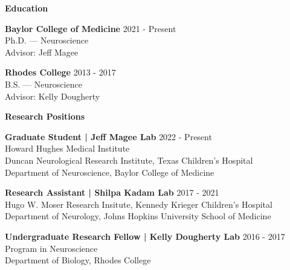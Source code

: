 \documentclass{resume} %
\begin{document}
\begin{rSection}{{\bfseries Education}}
 
    {\bfseries Baylor College of Medicine} \hfill { 2021 - Present }
    \\ Ph.D. — Neuroscience
    \\ Advisor: Jeff Magee \vspace{0.3\baselineskip}
    
    {\bfseries Rhodes College} \hfill { 2013 - 2017  }
    \\ B.S. — Neuroscience
    \\ Advisor: Kelly Dougherty 
    \end{rSection}


\begin{rSection}{{\bfseries Research Positions}}
    
    {\bfseries Graduate Student | Jeff Magee Lab} \hfill {2022 - Present}
    \\ Howard Hughes Medical Institute
    \\ Duncan Neurological Research Institute, Texas Children's Hospital 
    \\ Department of Neuroscience, Baylor College of Medicine \vspace{0.3\baselineskip}

    {\bfseries Research Assistant | Shilpa Kadam Lab} \hfill {2017 - 2021} 
    \\ Hugo W. Moser Research Insitute, Kennedy Krieger Children's Hospital
    \\ Department of Neurology, Johns Hopkins University School of Medicine \vspace{0.3\baselineskip}

    {\bfseries Undergraduate Research Fellow | Kelly Dougherty Lab} \hfill {2016 - 2017} 
    \\ Program in Neuroscience
    \\ Department of Biology, Rhodes College  \vspace{0.3\baselineskip}
\end{rSection}
\end{document}
